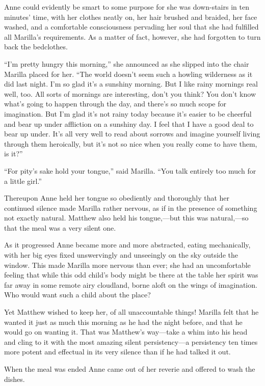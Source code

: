 \documentclass[a4paper]{article}
\begin{document}
Anne could evidently be smart to some purpose for she was down-stairs in ten minutes' time, with her clothes neatly on, her hair brushed and braided, her face washed, and a comfortable consciousness pervading her soul that she had fulfilled all Marilla's requirements. As a matter of fact, however, she had forgotten to turn back the bedclothes.

``I'm pretty hungry this morning,'' she announced as she slipped into the chair Marilla placed for her. ``The world doesn't seem such a howling wilderness as it did last night. I'm so glad it's a sunshiny morning. But I like rainy mornings real well, too. All sorts of mornings are interesting, don't you think? You don't know what's going to happen through the day, and there's so much scope for imagination. But I'm glad it's not rainy today because it's easier to be cheerful and bear up under affliction on a sunshiny day. I feel that I have a good deal to bear up under. It's all very well to read about sorrows and imagine yourself living through them heroically, but it's not so nice when you really come to have them, is it?''

\huge{``For pity's sake hold your tongue,'' said Marilla. ``You talk entirely too much for a little girl.''}

Thereupon Anne held her tongue so obediently and thoroughly that her continued silence made Marilla rather nervous, as if in the presence of something not exactly natural. Matthew also held his tongue,---but this was natural,---so that the meal was a very silent one.

As it progressed Anne became more and more abstracted, eating mechanically, with her big eyes fixed unswervingly and unseeingly on the sky outside the window. This made Marilla more nervous than ever; she had an uncomfortable feeling that while this odd child's body might be there at the table her spirit was far away in some remote airy cloudland, borne aloft on the wings of imagination. Who would want such a child about the place?

\Huge{Yet Matthew wished to keep her, of all unaccountable things! Marilla felt that he wanted it just as much this morning as he had the night before, and that he would go on wanting it. That was Matthew's way---take a whim into his head and cling to it with the most amazing silent persistency---a persistency ten times more potent and effectual in its very silence than if he had talked it out.}

When the meal was ended Anne came out of her reverie and offered to wash the dishes.
\end{document}
